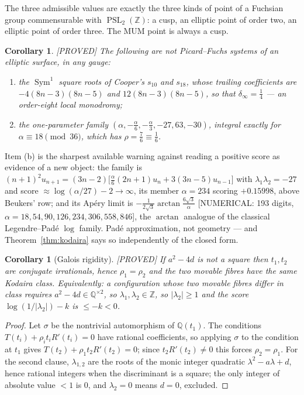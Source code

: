 \documentclass[11pt,reqno]{amsart}
\theoremstyle{plain}
\newtheorem{corollary}[theorem]{Corollary}
\theoremstyle{definition}
\theoremstyle{remark}
\theoremstyle{plain}
\newcommand{\Z}{\mathbb{Z}}
\newcommand{\Q}{\mathbb{Q}}
\DeclareMathOperator{\PSL}{PSL}
\DeclareMathOperator{\Sym}{Sym}
\newcommand{\Proved}{\textup{\textsf{[PROVED]}}}
\newcommand{\Numerical}[1]{\textup{\textsf{[NUMERICAL: #1]}}}
\begin{document}
The three admissible values are exactly the three kinds of point of a Fuchsian
group commensurable with $\PSL_2(\Z)$: a cusp, an elliptic point of order two,
an elliptic point of order three. The MUM point is always a cusp.

\begin{corollary}\label{cor:excluded}
\Proved{} The following are \emph{not} Picard--Fuchs systems of an elliptic
surface, in any gauge:
\begin{enumerate}[label=\textup{(\alph*)},leftmargin=2.4em]
\item the $\Sym^1$ square roots of Cooper's $s_{10}$ and $s_{18}$, whose trailing
coefficients are $-4(8n-3)(8n-5)$ and $12(8n-3)(8n-5)$, so that
$\delta_\infty=\tfrac14$ --- an order-eight local monodromy;
\item the one-parameter family
$(\alpha,-\tfrac\alpha6,-\tfrac\alpha3,-27,63,-30)$, integral exactly for
$\alpha\equiv18\pmod{36}$, which has $\rho=\tfrac76\equiv\tfrac16$.
\end{enumerate}
\end{corollary}

Item (b) is the sharpest available warning against reading a positive score as
evidence of a new object: the family is
$(n+1)^2u_{n+1}=(3n-2)\bigl[\tfrac\alpha6(2n+1)u_n+3(3n-5)u_{n-1}\bigr]$ with
$\lambda_1\lambda_2=-27$ and score $\approx\log(\alpha/27)-2\to\infty$, its member
$\alpha=234$ scoring $+0.15998$, above Beukers' row; and its Ap\'ery limit is
$-\tfrac1{2\sqrt3}\arctan\tfrac{6\sqrt3}\alpha$
\Numerical{193 digits, $\alpha=18,54,90,126,234,306,558,846$}, the $\arctan$
analogue of the classical Legendre--Pad\'e $\log$ family. Pad\'e approximation,
not geometry --- and Theorem~\ref{thm:kodaira} says so independently of the closed
form.

\begin{corollary}[Galois rigidity]\label{cor:galois}
\Proved{} If $a^2-4d$ is not a square then $t_1,t_2$ are conjugate irrationals,
hence $\rho_1=\rho_2$ and the two movable fibres have the same Kodaira class.
Equivalently: a configuration whose two movable fibres differ in class requires
$a^2-4d\in\Q^{\times2}$, so $\lambda_1,\lambda_2\in\Z$, so $|\lambda_2|\ge1$ and
the score $\log(1/|\lambda_2|)-k$ is $\le-k<0$.
\end{corollary}

\begin{proof}
Let $\sigma$ be the nontrivial automorphism of $\Q(t_1)$. The conditions
$T(t_i)+\rho_i t_iR'(t_i)=0$ have rational coefficients, so applying $\sigma$ to
the condition at $t_1$ gives $T(t_2)+\rho_1t_2R'(t_2)=0$; since
$t_2R'(t_2)\ne0$ this forces $\rho_2=\rho_1$. For the second clause,
$\lambda_{1,2}$ are the roots of the monic integer quadratic
$\lambda^2-a\lambda+d$, hence rational integers when the discriminant is a
square; the only integer of absolute value $<1$ is $0$, and $\lambda_2=0$ means
$d=0$, excluded.
\end{proof}
\end{document}
